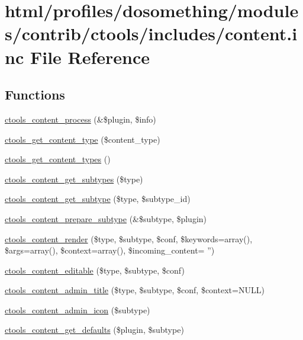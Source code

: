 \hypertarget{content_8inc}{
\section{html/profiles/dosomething/modules/contrib/ctools/includes/content.inc File Reference}
\label{content_8inc}
}
\subsection*{Functions}
\begin{DoxyCompactItemize}
\item 
\hyperlink{content_8inc_acad481b57f87b650fa0a8cf2b29b6548}{ctools\_\-content\_\-process} (\&\$plugin, \$info)
\item 
\hyperlink{content_8inc_a41fa9354b9c05ff536e74913921739dd}{ctools\_\-get\_\-content\_\-type} (\$content\_\-type)
\item 
\hyperlink{content_8inc_ae76cc86416c34ae727a2261cb158f1b6}{ctools\_\-get\_\-content\_\-types} ()
\item 
\hyperlink{content_8inc_aebe7b424bae151218c7f2e1670d67b96}{ctools\_\-content\_\-get\_\-subtypes} (\$type)
\item 
\hyperlink{content_8inc_a097e7d6c457337992167d8fffbffeb2a}{ctools\_\-content\_\-get\_\-subtype} (\$type, \$subtype\_\-id)
\item 
\hyperlink{content_8inc_a7a4b1689ccc9acb74be39fe2de1d35ab}{ctools\_\-content\_\-prepare\_\-subtype} (\&\$subtype, \$plugin)
\item 
\hyperlink{content_8inc_ae0ad07a6b466f81e14a32b70c716f3a1}{ctools\_\-content\_\-render} (\$type, \$subtype, \$conf, \$keywords=array(), \$args=array(), \$context=array(), \$incoming\_\-content= '')
\item 
\hyperlink{content_8inc_ad7386957cafa4ac906da577b4f12ddfd}{ctools\_\-content\_\-editable} (\$type, \$subtype, \$conf)
\item 
\hyperlink{content_8inc_aa2e438783f4289d5388c15061e93e0a2}{ctools\_\-content\_\-admin\_\-title} (\$type, \$subtype, \$conf, \$context=NULL)
\item 
\hyperlink{content_8inc_a8a34ea697f0793ce3d937ad6e80970ef}{ctools\_\-content\_\-admin\_\-icon} (\$subtype)
\item 
\hyperlink{content_8inc_a528e74fc0b05f44ec27dfc2604f645d5}{ctools\_\-content\_\-get\_\-defaults} (\$plugin, \$subtype)
\item 

\end{DoxyCompactItemize}
